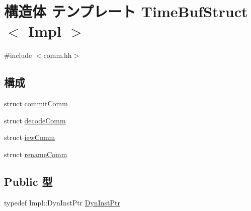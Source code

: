 \hypertarget{structTimeBufStruct}{
\section{構造体 テンプレート TimeBufStruct$<$ Impl $>$}
\label{structTimeBufStruct}
}


{\ttfamily \#include $<$comm.hh$>$}\subsection*{構成}
\begin{DoxyCompactItemize}
\item 
struct \hyperlink{structTimeBufStruct_1_1commitComm}{commitComm}
\item 
struct \hyperlink{structTimeBufStruct_1_1decodeComm}{decodeComm}
\item 
struct \hyperlink{structTimeBufStruct_1_1iewComm}{iewComm}
\item 
struct \hyperlink{structTimeBufStruct_1_1renameComm}{renameComm}
\end{DoxyCompactItemize}
\subsection*{Public 型}
\begin{DoxyCompactItemize}
\item 
typedef Impl::DynInstPtr \hyperlink{structTimeBufStruct_a028ce10889c5f6450239d9e9a7347976}{DynInstPtr}
\end{DoxyCompactItemize}
